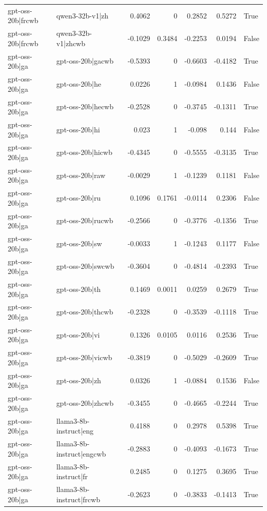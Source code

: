 \begin{table}
\begin{tabular}{l l r r r r l}
gpt-oss-20b|frcwb & qwen3-32b-v1|zh & 0.4062 & 0 & 0.2852 & 0.5272 & True \\
gpt-oss-20b|frcwb & qwen3-32b-v1|zhcwb & -0.1029 & 0.3484 & -0.2253 & 0.0194 & False \\
gpt-oss-20b|ga & gpt-oss-20b|gacwb & -0.5393 & 0 & -0.6603 & -0.4182 & True \\
gpt-oss-20b|ga & gpt-oss-20b|he & 0.0226 & 1 & -0.0984 & 0.1436 & False \\
gpt-oss-20b|ga & gpt-oss-20b|hecwb & -0.2528 & 0 & -0.3745 & -0.1311 & True \\
gpt-oss-20b|ga & gpt-oss-20b|hi & 0.023 & 1 & -0.098 & 0.144 & False \\
gpt-oss-20b|ga & gpt-oss-20b|hicwb & -0.4345 & 0 & -0.5555 & -0.3135 & True \\
gpt-oss-20b|ga & gpt-oss-20b|raw & -0.0029 & 1 & -0.1239 & 0.1181 & False \\
gpt-oss-20b|ga & gpt-oss-20b|ru & 0.1096 & 0.1761 & -0.0114 & 0.2306 & False \\
gpt-oss-20b|ga & gpt-oss-20b|rucwb & -0.2566 & 0 & -0.3776 & -0.1356 & True \\
gpt-oss-20b|ga & gpt-oss-20b|sw & -0.0033 & 1 & -0.1243 & 0.1177 & False \\
gpt-oss-20b|ga & gpt-oss-20b|swcwb & -0.3604 & 0 & -0.4814 & -0.2393 & True \\
gpt-oss-20b|ga & gpt-oss-20b|th & 0.1469 & 0.0011 & 0.0259 & 0.2679 & True \\
gpt-oss-20b|ga & gpt-oss-20b|thcwb & -0.2328 & 0 & -0.3539 & -0.1118 & True \\
gpt-oss-20b|ga & gpt-oss-20b|vi & 0.1326 & 0.0105 & 0.0116 & 0.2536 & True \\
gpt-oss-20b|ga & gpt-oss-20b|vicwb & -0.3819 & 0 & -0.5029 & -0.2609 & True \\
gpt-oss-20b|ga & gpt-oss-20b|zh & 0.0326 & 1 & -0.0884 & 0.1536 & False \\
gpt-oss-20b|ga & gpt-oss-20b|zhcwb & -0.3455 & 0 & -0.4665 & -0.2244 & True \\
gpt-oss-20b|ga & llama3-8b-instruct|eng & 0.4188 & 0 & 0.2978 & 0.5398 & True \\
gpt-oss-20b|ga & llama3-8b-instruct|engcwb & -0.2883 & 0 & -0.4093 & -0.1673 & True \\
gpt-oss-20b|ga & llama3-8b-instruct|fr & 0.2485 & 0 & 0.1275 & 0.3695 & True \\
gpt-oss-20b|ga & llama3-8b-instruct|frcwb & -0.2623 & 0 & -0.3833 & -0.1413 & True \\

\end{tabular}
\end{table}
